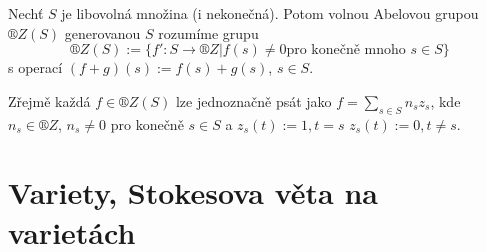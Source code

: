 \documentclass[12pt]{article}					%
\begin{document}
        \begin{poznamka}
                Nechť $S$ je libovolná množina (i nekonečná). Potom volnou Abelovou grupou $®Z(S)$ generovanou $S$ rozumíme grupu
                $$ ®Z(S) := \{f': S\rightarrow ®Z| f(s)≠0 \text{pro konečně mnoho $s\in S$}\} $$
                s operací $(f + g)(s) := f(s) + g(s)$, $s \in S$.

                Zřejmě každá $f \in ®Z(S)$ lze jednoznačně psát jako $f = \sum_{s \in S}n_s z_s$, kde $n_s \in ®Z$, $n_s ≠ 0$ pro konečně $s\in S$ a $z_s(t):=1, t=s$ $z_s(t):= 0, t≠s$. 
        \end{poznamka}

\section{Variety, Stokesova věta na varietách}

    
\end{document}
